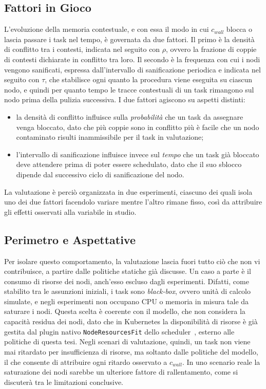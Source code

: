\subsection{Fattori in Gioco}
\label{subsec:fattori_valutazione}

L'evoluzione della memoria contestuale, e con essa il modo in cui $c_{wall}$ blocca o lascia passare i task nel tempo, è governata da due fattori. Il primo è la densità di conflitto tra i contesti, indicata nel seguito con $\rho$, ovvero la frazione di coppie di contesti dichiarate in conflitto tra loro. Il secondo è la frequenza con cui i nodi vengono sanificati, espressa dall'intervallo di sanificazione periodica e indicata nel seguito con $\tau$, che stabilisce ogni quanto la procedura viene eseguita su ciascun nodo, e quindi per quanto tempo le tracce contestuali di un task rimangono sul nodo prima della pulizia successiva. I due fattori agiscono su aspetti distinti:
\begin{itemize}
    \item la densità di conflitto influisce sulla \emph{probabilità} che un task da assegnare venga bloccato, dato che più coppie sono in conflitto più è facile che un nodo contaminato risulti inammissibile per il task in valutazione;
    \item l'intervallo di sanificazione influisce invece sul \emph{tempo} che un task già bloccato deve attendere prima di poter essere schedulato, dato che il suo sblocco dipende dal successivo ciclo di sanificazione del nodo.
\end{itemize}

La valutazione è perciò organizzata in due esperimenti, ciascuno dei quali isola uno dei due fattori facendolo variare mentre l'altro rimane fisso, così da attribuire gli effetti osservati alla variabile in studio.


\subsection{Perimetro e Aspettative}
\label{subsec:perimetro_valutazione}

Per isolare questo comportamento, la valutazione lascia fuori tutto ciò che non vi contribuisce, a partire dalle politiche statiche già discusse. Un caso a parte è il consumo di risorse dei nodi, anch'esso escluso dagli esperimenti. Difatti, come stabilito tra le assunzioni iniziali, i task sono \emph{black-box}, ovvero unità di calcolo simulate, e negli esperimenti non occupano CPU o memoria in misura tale da saturare i nodi. Questa scelta è coerente con il modello, che non considera la capacità residua dei nodi, dato che in Kubernetes la disponibilità di risorse è già gestita dal plugin nativo \texttt{NodeResourcesFit} dello scheduler~\cite{k8s-scheduler-config}, esterno alle politiche di questa tesi. Negli scenari di valutazione, quindi, un task non viene mai ritardato per insufficienza di risorse, ma soltanto dalle politiche del modello, il che consente di attribuire ogni ritardo osservato a $c_{wall}$. In uno scenario reale la saturazione dei nodi sarebbe un ulteriore fattore di rallentamento, come si discuterà tra le limitazioni conclusive.

